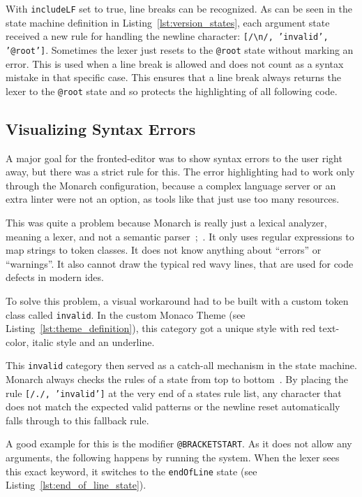 With \texttt{includeLF} set to true, line breaks can be recognized. As can be seen in the state machine definition in Listing~\ref{lst:version_states}, each argument state received a new rule for handling the newline character: \texttt{[/\textbackslash n/, 'invalid', '@root']}. Sometimes the lexer just resets to the \texttt{@root} state without marking an error. This is used when a line break is allowed and does not count as a syntax mistake in that specific case. This ensures that a line break always returns the lexer to the \texttt{@root} state and so protects the highlighting of all following code.

\subsection{Visualizing Syntax Errors}

A major goal for the fronted-editor was to show syntax errors to the user right away, but there was a strict rule for this. The error highlighting had to work only through the Monarch configuration, because a complex language server or an extra linter were not an option, as tools like that just use too many resources.

This was quite a problem because Monarch is really just a lexical analyzer, meaning a lexer, and not a semantic parser~\cite{MonacoMonarchDocs};~\cite[pp.~5-8]{Aho2006}. It only uses regular expressions to map strings to token classes. It does not know anything about ``errors'' or ``warnings''. It also cannot draw the typical red wavy lines, that are used for code defects in modern \glspl{ide}.

To solve this problem, a visual workaround had to be built with a custom token class called \texttt{invalid}. In the custom Monaco Theme (see Listing~\ref{lst:theme_definition}), this category got a unique style with red text-color,  italic style and an underline.

This \texttt{invalid} category then served as a catch-all mechanism in the state machine. Monarch always checks the rules of a state from top to bottom~\cite{MonacoMonarchDocs}. By placing the rule \texttt{[/./, 'invalid']} at the very end of a states rule list, any character that does not match the expected valid patterns or the newline reset automatically falls through to this fallback rule.

A good  example for this is the modifier \texttt{@BRACKETSTART}. As it does not allow any arguments, the following happens by running the system. When the lexer sees this exact keyword, it switches to the \texttt{endOfLine} state (see Listing~\ref{lst:end_of_line_state}).

